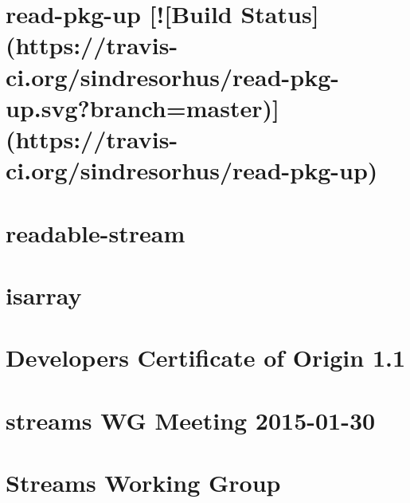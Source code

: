 \documentclass[twoside]{book}
\newcommand{\+}{\discretionary{\mbox{\scriptsize$\hookleftarrow$}}{}{}}
\begin{document}
\chapter{read-\/pkg-\/up \mbox{[}!\mbox{[}Build Status\mbox{]}(https\+://travis-\/ci.org/sindresorhus/read-\/pkg-\/up.svg?branch=master)\mbox{]}(https\+://travis-\/ci.org/sindresorhus/read-\/pkg-\/up)}
\label{md_dsmacc_vis_degree_node_modules_read-pkg-up_readme}

\chapter{readable-\/stream}
\label{md_dsmacc_vis_degree_node_modules_readable-stream_README}

\chapter{isarray}
\label{md_dsmacc_vis_degree_node_modules_readdirp_node_modules_isarray_README}

\chapter{Developer\textquotesingle{}s Certificate of Origin 1.1}
\label{md_dsmacc_vis_degree_node_modules_readdirp_node_modules_readable-stream_CONTRIBUTING}

\chapter{streams WG Meeting 2015-\/01-\/30}
\label{md_dsmacc_vis_degree_node_modules_readdirp_node_modules_readable-stream_doc_wg-meetings_2015-01-30}

\chapter{Streams Working Group}
\label{md_dsmacc_vis_degree_node_modules_readdirp_node_modules_readable-stream_GOVERNANCE}

\end{document}

